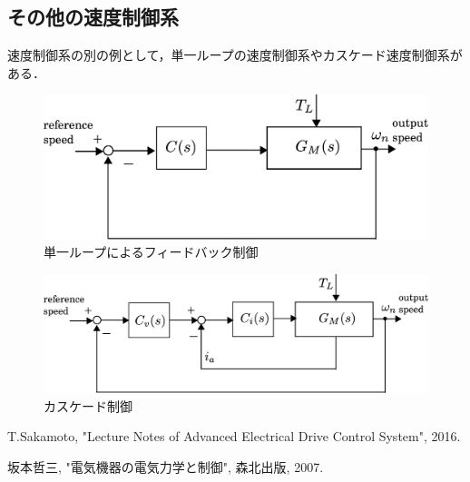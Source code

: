 \documentclass[a4paper,12pt]{jarticle}
\begin{document}
\subsection{その他の速度制御系}
速度制御系の別の例として，単一ループの速度制御系やカスケード速度制御系が
ある．
%
\begin{figure}[htbp]
 \begin{center}
  \includegraphics[width = 150mm]{fig/FB_model.eps}
 \end{center}
 \caption{単一ループによるフィードバック制御}
 \label{fig:FB_model}
\end{figure}
%
\begin{figure}[htbp]
 \begin{center}
  \includegraphics[width = 150mm]{fig/cas_model.eps}
 \end{center}
 \caption{カスケード制御}
 \label{fig:cas_model}
\end{figure}
%
%
\newpage
%
\begin{thebibliography}{99}

  T.Sakamoto,
		 "Lecture Notes of Advanced Electrical Drive Control System", 2016.

  坂本哲三, "電気機器の電気力学と制御", 森北出版, 2007.

\end{thebibliography}
\end{document}
